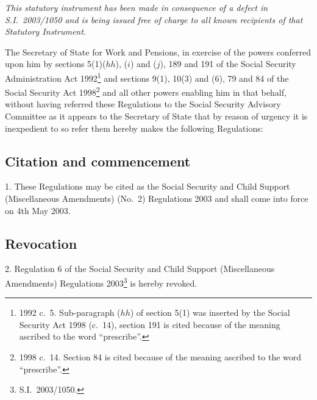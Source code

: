 \documentclass[12pt,a4paper]{article}
\title{\regstitle}
\author{S.I.\ 2003 No.\ 1189}
\date{Made
29th April 2003\\
Laid before Parliament
2nd May 2003\\
Coming into force
4th May 2003
}
\begin{document}
\maketitle

\begin{center}
\itshape 
This statutory instrument has been made in consequence of a defect in S.I.\ 2003/1050 and is being issued free of charge to all known recipients of that Statutory Instrument. 
\end{center}

\noindent
The Secretary of State for Work and Pensions, in exercise of the powers conferred upon him by sections 5(1)($hh$), ($i$) and ($j$), 189 and 191 of the Social Security Administration Act 1992\footnote{1992 c.\ 5. Sub-paragraph ($hh$)  of section 5(1) was inserted by the Social Security Act 1998 (c.\ 14), section 191 is cited because of the meaning ascribed to the word “prescribe”.} and sections 9(1), 10(3) and (6), 79 and 84 of the Social Security Act 1998\footnote{1998 c.\ 14. Section 84 is cited because of the meaning ascribed to the word “prescribe”.} and all other powers enabling him in that behalf, without having referred these Regulations to the Social Security Advisory Committee as it appears to the Secretary of State that by reason of urgency it is inexpedient to so refer them hereby makes the following Regulations: 

{\sloppy

\tableofcontents

}

\bigskip

\setcounter{secnumdepth}{-2}

\subsection[1. Citation and commencement]{Citation and commencement}

1.  These Regulations may be cited as the Social Security and Child Support (Miscellaneous Amendments) (No.\ 2) Regulations 2003 and shall come into force on 4th May 2003.

\subsection[2. Revocation]{Revocation}

2.  Regulation 6 of the Social Security and Child Support (Miscellaneous Amendments) Regulations 2003\footnote{S.I.\ 2003/1050.} is hereby revoked.
\end{document}

